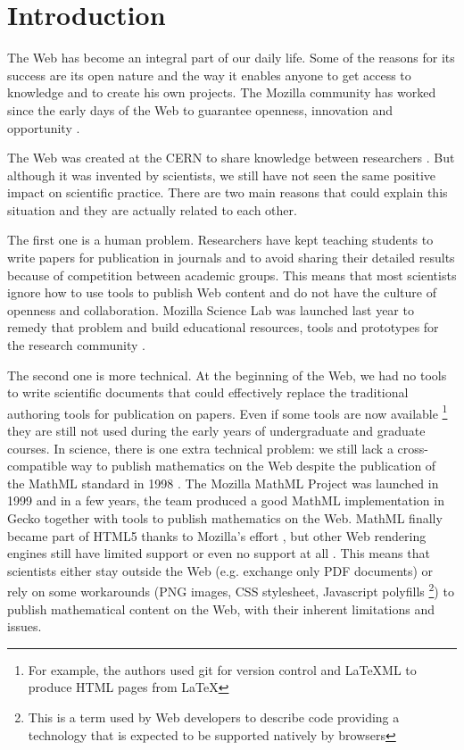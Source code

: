 \section*{Introduction}

The Web has become an integral part of our daily life. Some of the reasons for
its success are its open nature and the way it enables anyone to get access to
knowledge and to create his own projects. The Mozilla community has worked since
the early days of the Web to guarantee openness, innovation and opportunity
\cite{MozillaMission}.

The Web was created at the CERN to share knowledge between researchers
\cite{WebCreation}.
But although it was invented by scientists, we still have not seen
the same positive impact on scientific practice. There are two main reasons that
could explain this situation and they are actually related to each other.

The first one is a human problem. Researchers have kept teaching students
to write papers for publication in journals and to avoid sharing their detailed
results because of competition between academic groups. This means that most
scientists ignore
how to use tools to publish Web content and do not have the culture of openness
and collaboration. Mozilla Science Lab was launched last year to remedy that
problem and build educational resources, tools and prototypes for the research
community \cite{MozillaScienceLab}.

The second one is more technical. At the beginning of the Web, we had no tools
to write scientific documents that could effectively replace the traditional
authoring tools for publication on papers.
Even if some tools are now available 
\footnote{For example, the authors used git for version control and LaTeXML to
produce HTML pages from LaTeX}
they are still not used
during the early years of undergraduate and graduate courses.
In science, there is one extra technical problem:
we still lack a cross-compatible way to publish
mathematics on the Web despite the publication of the MathML standard in 1998
\cite{W3CMathHome}.
The Mozilla MathML Project \cite{MozillaMathML}
was launched in 1999 and in a few years, the team produced a good MathML
implementation in Gecko together with tools to publish mathematics on the Web.
MathML finally
became part of HTML5 thanks to Mozilla's effort \cite{MozillaMathMLHTML5},
but other Web rendering
engines still have limited support or even no support at all
\cite{MathMLForgesOn}. This means that
scientists either stay outside the Web (e.g. exchange only PDF documents) or
rely on some workarounds (PNG images, CSS stylesheet, Javascript polyfills
\footnote{This is a term used by Web developers to describe code providing a
technology that is expected to be supported natively by browsers})
to publish mathematical content on the Web, with their inherent limitations and
issues.

